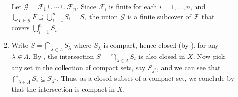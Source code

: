 \begin{enumerate}
\begin{pf}
\begin{enumerate}
Let \(\mathcal{G}=\mathcal{F}_1\cup\dotsb\cup \mathcal{F}_n\).  Since
\(\mathcal{F}_i\) is finite for each \(i=1,\dotsc,n\), and
\(\bigcup_{F\in\mathcal{G}}F\supseteq \bigcup_{i=1}^{n}S_i=S,\) the union
\(\mathcal{G}\) is a finite subcover of \(\mathcal{F}\) that covers
\(\bigcup_{i=1}^{n}S_i\).

\item Write \(S=\bigcap_{\lambda\in\Lambda}S_{\lambda}\) where \(S_{\lambda}\)
is compact, hence closed (by ), for any
\(\lambda\in\Lambda\).  By , the
intersection \(S= \bigcap_{\lambda\in\Lambda}S_i\) is also closed in \(X\). Now pick any
set in the collection of compact sets, say \(S_{\lambda^*}\), and we can see
that \(\bigcap_{\lambda\in\Lambda}S_i\subseteq S_{\lambda^*}\).  Thus, as a closed subset
of a compact set, we conclude by  that
the intersection is compact in \(X\).

\end{enumerate}
\end{pf}
\end{enumerate}
